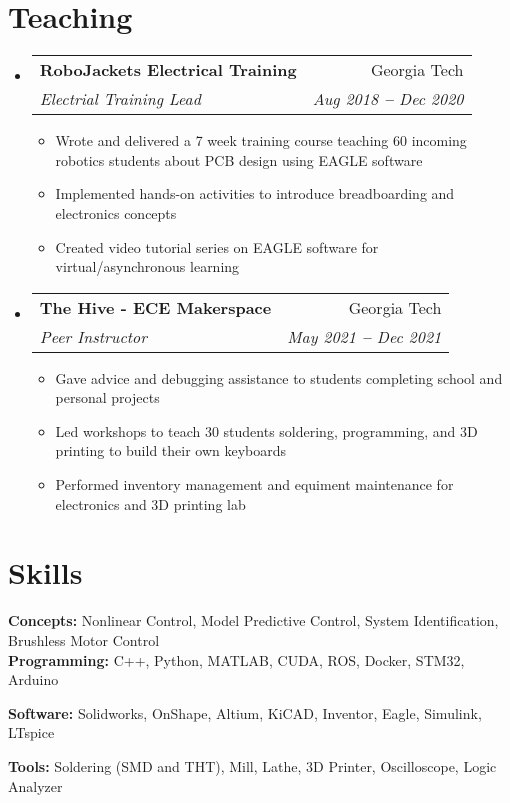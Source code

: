 \documentclass[letterpaper,11pt]{article}
\makeatletter
\newcommand{\resumeItem}[1]{
  \item\small{
    {#1 \vspace{-2pt}}
  }
}
\newcommand{\resumeSubheading}[4]{
  \vspace{-2pt}\item
    \begin{tabular*}{0.97\textwidth}[t]{l@{\extracolsep{\fill}}r}
      \textbf{#1} & #2 \\
      \textit{\small#3} & \textit{\small #4} \\
    \end{tabular*}\vspace{-7pt}
}
\newcommand{\resumeSubHeadingListStart}{\begin{itemize}[leftmargin=0.15in, label={}]}
\newcommand{\resumeSubHeadingListEnd}{\end{itemize}}
\newcommand{\resumeItemListStart}{\begin{itemize}}
\newcommand{\resumeItemListEnd}{\end{itemize}\vspace{-5pt}}
\makeatother
\begin{document}
\section{Teaching}
  \vspace{3pt}
  \resumeSubHeadingListStart
    \resumeSubheading
      {RoboJackets Electrical Training}{Georgia Tech}
      {Electrial Training Lead}{Aug 2018 \textbf{--} Dec 2020}
        \resumeItemListStart
    \resumeItem{Wrote and delivered a 7 week training course teaching 60 incoming robotics
    students about PCB design using EAGLE software}
    \resumeItem{Implemented hands-on activities to introduce breadboarding and
    electronics concepts}
    \resumeItem{Created video tutorial series on EAGLE software for
    virtual/asynchronous learning}
        \resumeItemListEnd

    \resumeSubheading
      {The Hive - ECE Makerspace}{Georgia Tech}
      {Peer Instructor}{May 2021 \textbf{--} Dec 2021}
        \resumeItemListStart
      \resumeItem{Gave advice and debugging assistance to students completing
      school and personal projects}
      \resumeItem{Led workshops to teach 30 students soldering, programming, and
      3D printing to build their own keyboards}
      \resumeItem{Performed inventory management and equiment maintenance for
      electronics and 3D printing lab}
        \resumeItemListEnd
  \resumeSubHeadingListEnd


\section{Skills}
  \vspace{2pt}
  \resumeSubHeadingListStart
    \small{\item{
        \textbf{Concepts:}{ Nonlinear Control, Model Predictive Control, System
        Identification, Brushless Motor Control} \\ \vspace{3pt}
        \textbf{Programming:}{ C++, Python, MATLAB, CUDA, ROS, Docker, STM32, Arduino } \\ \vspace{3pt}
        
        \textbf{Software:}{ Solidworks, OnShape, Altium, KiCAD, Inventor, Eagle, Simulink, LTspice} \\ \vspace{3pt}
        
        \textbf{Tools:}{ Soldering (SMD and THT), Mill, Lathe, 3D Printer, Oscilloscope, Logic Analyzer}
        
    }}
  \resumeSubHeadingListEnd
\end{document}
